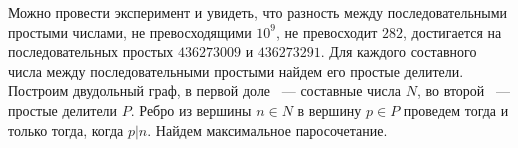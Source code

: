 Можно провести эксперимент и увидеть, что
разность между последовательными простыми числами,
не превосходящими $10^9$, не превосходит $282$,
достигается на последовательных простых $436273009$
и $436273291$. Для каждого составного числа
между последовательными простыми найдем
его простые делители. Построим двудольный
граф, в первой доле ~--- составные числа $N$,
во второй ~--- простые делители $P$. Ребро из вершины
$n \in N$ в вершину $p \in P$ проведем тогда и только тогда,
когда $p | n$. Найдем максимальное паросочетание.
